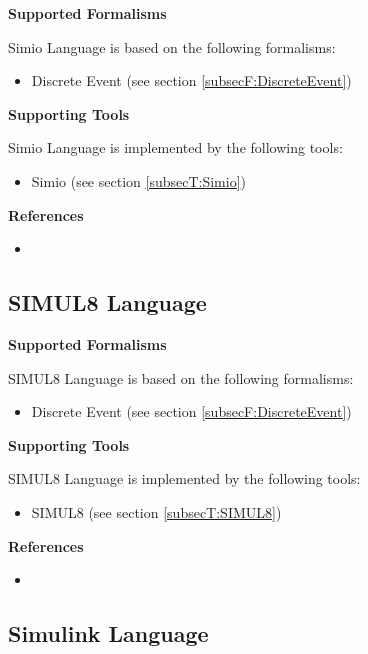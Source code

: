 \textbf{Supported Formalisms}

Simio Language is based on the following formalisms:
\begin{itemize}
	\item Discrete Event (see section \ref{subsecF:DiscreteEvent})
\end{itemize}


\textbf{Supporting Tools}

Simio Language is implemented by the following tools:
\begin{itemize}
	\item Simio (see section \ref{subsecT:Simio})
\end{itemize}


\textbf{References}
\begin{itemize}
	
\item {}
\end{itemize}



\subsection{SIMUL8 Language}
\label{subsecL:SIMUL8Language}



\textbf{Supported Formalisms}

SIMUL8 Language is based on the following formalisms:
\begin{itemize}
	\item Discrete Event (see section \ref{subsecF:DiscreteEvent})
\end{itemize}


\textbf{Supporting Tools}

SIMUL8 Language is implemented by the following tools:
\begin{itemize}
	\item SIMUL8 (see section \ref{subsecT:SIMUL8})
\end{itemize}


\textbf{References}
\begin{itemize}
	
\item {}
\end{itemize}



\subsection{Simulink Language}
\label{subsecL:SimulinkLanguage}


